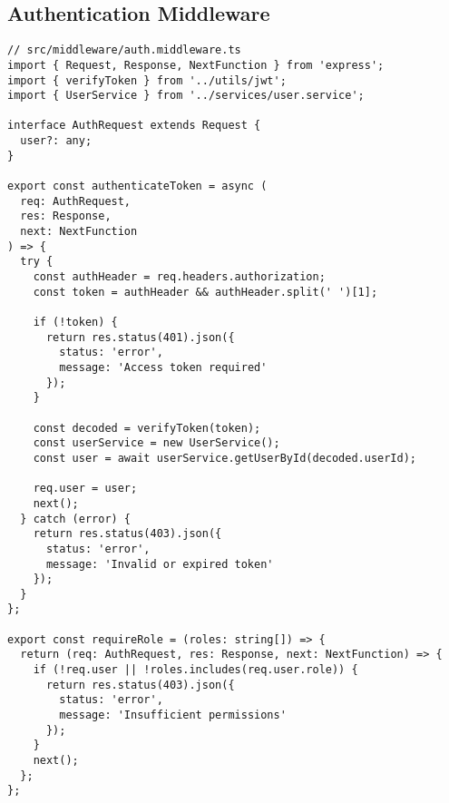 \documentclass[12pt,a4paper]{article}
\begin{document}
\subsection{Authentication Middleware}
\begin{lstlisting}[caption=JWT Authentication Middleware]
// src/middleware/auth.middleware.ts
import { Request, Response, NextFunction } from 'express';
import { verifyToken } from '../utils/jwt';
import { UserService } from '../services/user.service';

interface AuthRequest extends Request {
  user?: any;
}

export const authenticateToken = async (
  req: AuthRequest,
  res: Response,
  next: NextFunction
) => {
  try {
    const authHeader = req.headers.authorization;
    const token = authHeader && authHeader.split(' ')[1];

    if (!token) {
      return res.status(401).json({
        status: 'error',
        message: 'Access token required'
      });
    }

    const decoded = verifyToken(token);
    const userService = new UserService();
    const user = await userService.getUserById(decoded.userId);

    req.user = user;
    next();
  } catch (error) {
    return res.status(403).json({
      status: 'error',
      message: 'Invalid or expired token'
    });
  }
};

export const requireRole = (roles: string[]) => {
  return (req: AuthRequest, res: Response, next: NextFunction) => {
    if (!req.user || !roles.includes(req.user.role)) {
      return res.status(403).json({
        status: 'error',
        message: 'Insufficient permissions'
      });
    }
    next();
  };
};
\end{lstlisting}
\end{document}
